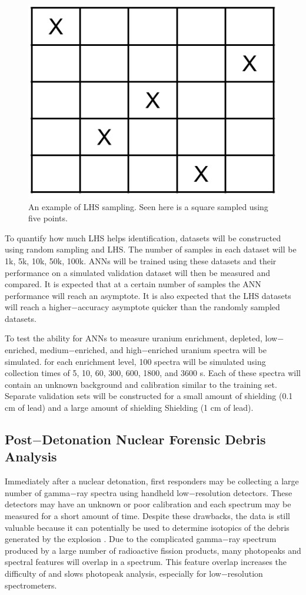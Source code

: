\documentclass[tocnosub,noragright,centerchapter,12pt,fullpage]{uiucecethesis09}
\begin{document}
\begin{figure}[H]
\centering
\includegraphics[width=0.4\linewidth]{images/LHS_example}
\caption{An example of LHS sampling. Seen here is a square sampled using five points.}
\label{fig:LHS_example}
\end{figure}

To quantify how much LHS helps identification, datasets will be constructed using random sampling and LHS. The number of samples in each dataset will be 1k, 5k, 10k, 50k, 100k. ANNs will be trained using these datasets and their  performance on a simulated validation dataset will then be measured and compared. It is expected that at a certain number of samples the ANN performance will reach an asymptote. It is also expected that the LHS datasets will reach a higher$-$accuracy asymptote quicker than the randomly sampled datasets. 


To test the ability for ANNs to measure uranium enrichment, depleted, low$-$enriched, medium$-$enriched, and high$-$enriched uranium spectra will be simulated. for each enrichment level, 100 spectra will be simulated using collection times of 5, 10, 60, 300, 600, 1800, and 3600 s. Each of these spectra will contain an unknown background and calibration similar to the training set. Separate validation sets will be constructed for a small amount of shielding (0.1 cm of lead) and a large amount of shielding Shielding (1 cm of lead). 



\subsection{Post$-$Detonation Nuclear Forensic Debris Analysis}

Immediately after a nuclear detonation, first responders may be collecting a large number of gamma$-$ray spectra using handheld low$-$resolution detectors. These detectors may have an unknown or poor calibration and each spectrum may be measured for a short amount of time. Despite these drawbacks, the data is still valuable because it can potentially be used to determine isotopics of the debris generated by the explosion \cite{Moody}. Due to the complicated gamma$-$ray spectrum produced by a large number of radioactive fission products, many photopeaks and spectral features will overlap in a spectrum. This feature overlap increases the difficulty of and slows photopeak analysis, especially for low$-$resolution spectrometers. 
\end{document}
